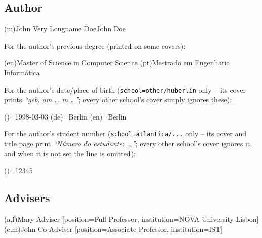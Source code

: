 \subsection{Author}
\label{sub:author}

\begin{latexcode}
\ntauthorname(m){John Very Longname Doe}{John Doe}
\end{latexcode}

For the author's previous degree (printed on some covers):
\begin{latexcode}
\ntauthordegree(en){Master of Science in Computer Science}
\ntauthordegree(pt){Mestrado em Engenharia Informática}
\end{latexcode}

For the author's date/place of birth (\texttt{school=other/huberlin} only --
its cover prints \emph{``geb. am \ldots{} in \ldots{}''}; every other
school's cover simply ignores these):
\begin{latexcode}
\SetAuthorBirthDate*()={1998-03-03}   %
\SetAuthorBirthPlace*(de)={Berlin}    %
\SetAuthorBirthPlace*(en)={Berlin}
\end{latexcode}

For the author's student number (\texttt{school=atlantica/...} only -- its
cover and title page print \emph{``N\'umero do estudante: \ldots{}''}; every
other school's cover ignores it, and when it is not set the line is omitted):
\begin{latexcode}
\SetAuthorStudentNumber*()={12345}
\end{latexcode}

\subsection{Advisers}
\label{sub:advisers}

\begin{latexcode}
(a,f){Mary Adviser}
      [position=Full Professor, institution=NOVA University Lisbon]
(c,m){John Co-Adviser}
      [position=Associate Professor, institution=IST]
\end{latexcode}

